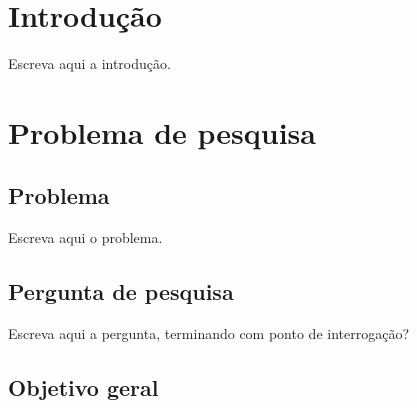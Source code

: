 \documentclass[12pt,a4paper]{article}
\begin{document}
\section{Introdução}
%
%
%

Escreva aqui a introdução.

\section{Problema de pesquisa}

\subsection{Problema}
%

Escreva aqui o problema.

\subsection{Pergunta de pesquisa}
%

Escreva aqui a pergunta, terminando com ponto de interrogação?

\subsection{Objetivo geral}
\end{document}
